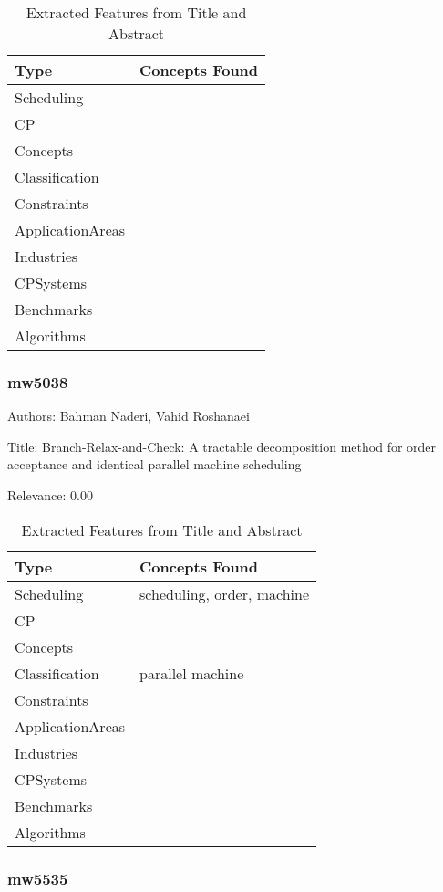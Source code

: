 {\scriptsize
\begin{longtable}{p{2cm}p{20cm}}
\caption{Extracted Features from Title and Abstract}\\ \toprule
Type & Concepts Found\\ \midrule
\endhead
\bottomrule
\endfoot
Scheduling & \\ 
CP & \\ 
Concepts & \\ 
Classification & \\ 
Constraints & \\ 
ApplicationAreas & \\ 
Industries & \\ 
CPSystems & \\ 
Benchmarks & \\ 
Algorithms & \\ 
\end{longtable}
}



\subsubsection{mw5038}
\label{mw:mw5038}

Authors: Bahman Naderi, Vahid Roshanaei

Title: Branch-Relax-and-Check: A tractable decomposition method for order acceptance and identical parallel machine scheduling

Relevance:  0.00

{\scriptsize
\begin{longtable}{p{2cm}p{20cm}}
\caption{Extracted Features from Title and Abstract}\\ \toprule
Type & Concepts Found\\ \midrule
\endhead
\bottomrule
\endfoot
Scheduling & scheduling, order, machine\\ 
CP & \\ 
Concepts & \\ 
Classification & parallel machine\\ 
Constraints & \\ 
ApplicationAreas & \\ 
Industries & \\ 
CPSystems & \\ 
Benchmarks & \\ 
Algorithms & \\ 
\end{longtable}
}



\subsubsection{mw5535}
\label{mw:mw5535}

